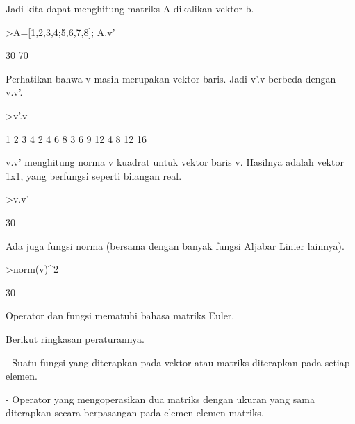 \documentclass[a4paper,10pt]{article}
\begin{document}
\begin{eulernotebook}
\begin{eulercomment}
\begin{eulercomment}
\begin{eulercomment}
\begin{eulercomment}
\begin{eulercomment}
\begin{eulercomment}
\begin{eulercomment}
\begin{eulercomment}
\begin{eulercomment}
Jadi kita dapat menghitung matriks A dikalikan vektor b.
\end{eulercomment}
\begin{eulerprompt}
>A=[1,2,3,4;5,6,7,8]; A.v'
\end{eulerprompt}
\begin{euleroutput}
             30 
             70 
\end{euleroutput}
\begin{eulercomment}
Perhatikan bahwa v masih merupakan vektor baris. Jadi v'.v berbeda
dengan v.v'.
\end{eulercomment}
\begin{eulerprompt}
>v'.v
\end{eulerprompt}
\begin{euleroutput}
              1             2             3             4 
              2             4             6             8 
              3             6             9            12 
              4             8            12            16 
\end{euleroutput}
\begin{eulercomment}
v.v' menghitung norma v kuadrat untuk vektor baris v. Hasilnya adalah
vektor 1x1, yang berfungsi seperti bilangan real.
\end{eulercomment}
\begin{eulerprompt}
>v.v'
\end{eulerprompt}
\begin{euleroutput}
  30
\end{euleroutput}
\begin{eulercomment}
Ada juga fungsi norma (bersama dengan banyak fungsi Aljabar Linier
lainnya).
\end{eulercomment}
\begin{eulerprompt}
>norm(v)^2
\end{eulerprompt}
\begin{euleroutput}
  30
\end{euleroutput}
\begin{eulercomment}
Operator dan fungsi mematuhi bahasa matriks Euler.

Berikut ringkasan peraturannya.

- Suatu fungsi yang diterapkan pada vektor atau matriks diterapkan
pada setiap elemen.

- Operator yang mengoperasikan dua matriks dengan ukuran yang sama
diterapkan secara berpasangan pada elemen-elemen matriks.


\end{eulercomment}
\end{eulercomment}
\end{eulercomment}
\end{eulercomment}
\end{eulercomment}
\end{eulercomment}
\end{eulercomment}
\end{eulercomment}
\end{eulercomment}
\end{eulernotebook}
\end{document}

